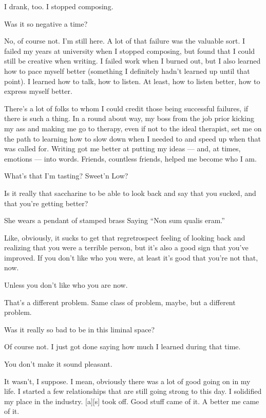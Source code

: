 I drank, too. I stopped composing.

\begin{ally}
Was it so negative a time?
\end{ally}
No, of course not. I'm still here. A lot of that failure was the valuable sort. I failed my years at university when I stopped composing, but found that I could still be creative when writing. I failed work when I burned out, but I also learned how to pace myself better (something I definitely hadn't learned up until that point). I learned how to talk, how to listen. At least, how to listen better, how to express myself better.

There's a lot of folks to whom I could credit those being successful failures, if there is such a thing. In a round about way, my boss from the job prior kicking my ass and making me go to therapy, even if not to the ideal therapist, set me on the path to learning how to slow down when I needed to and speed up when that was called for. Writing got me better at putting my ideas --- and, at times, emotions --- into words. Friends, countless friends, helped me become who I am.

\begin{ally}
What's that I'm tasting? Sweet'n Low?
\end{ally}
Is it really that saccharine to be able to look back and say that you sucked, and that you're getting better?

She wears a pendant of stamped brass Saying ``Non sum qualis eram.''

Like, obviously, it sucks to get that regretrospect feeling of looking back and realizing that you were a terrible person, but it's also a good sign that you've improved. If you don't like who you were, at least it's good that you're not that, now.

\begin{ally}
Unless you don't like who you are now.
\end{ally}
That's a different problem. Same class of problem, maybe, but a different problem.
\newpage

\begin{ally}
Was it really so bad to be in this liminal space?
\end{ally}
Of course not. I just got done saying how much I learned during that time.

\begin{ally}
You don't make it sound pleasant.
\end{ally}
It wasn't, I suppose. I mean, obviously there was a lot of good going on in my life. I started a few relationships that are still going strong to this day. I solidified my place in the industry. {[}a{]}{[}s{]} took off. Good stuff came of it. A better me came of it.

